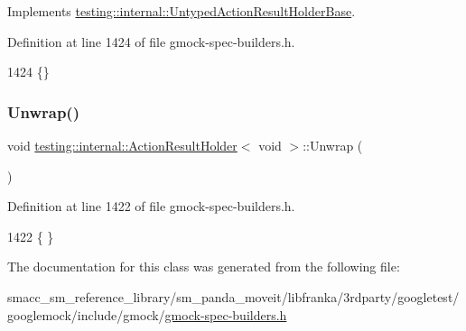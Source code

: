 Implements \hyperlink{classtesting_1_1internal_1_1UntypedActionResultHolderBase_a4b4a558fcb1d3b02c0fec34f186d3b90}{testing\+::internal\+::\+Untyped\+Action\+Result\+Holder\+Base}.



Definition at line 1424 of file gmock-\/spec-\/builders.\+h.


\begin{DoxyCode}
1424 \{\}
\end{DoxyCode}
\mbox{\label{classtesting_1_1internal_1_1ActionResultHolder_3_01void_01_4_aa57f371e1559b236e6424b2f50dcd6a2}} 
\subsubsection{\texorpdfstring{Unwrap()}{Unwrap()}}
{\footnotesize\ttfamily void \hyperlink{classtesting_1_1internal_1_1ActionResultHolder}{testing\+::internal\+::\+Action\+Result\+Holder}$<$ void $>$\+::Unwrap (\begin{DoxyParamCaption}{ }\end{DoxyParamCaption})\hspace{0.3cm}{\ttfamily [inline]}}



Definition at line 1422 of file gmock-\/spec-\/builders.\+h.


\begin{DoxyCode}
1422 \{ \}
\end{DoxyCode}


The documentation for this class was generated from the following file\+:\begin{DoxyCompactItemize}
\item 
smacc\+\_\+sm\+\_\+reference\+\_\+library/sm\+\_\+panda\+\_\+moveit/libfranka/3rdparty/googletest/googlemock/include/gmock/\hyperlink{gmock-spec-builders_8h}{gmock-\/spec-\/builders.\+h}\end{DoxyCompactItemize}

